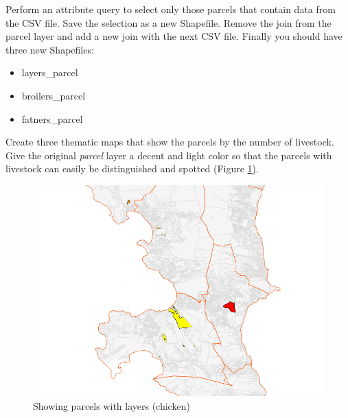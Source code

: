 \documentclass[a4paper,12pt,titlepage]{article}
\begin{document}
Perform an attribute query to select only those parcels that contain data from the CSV file. Save the selection as a new Shapefile. Remove the join from the parcel layer and add a new join with the next CSV file. Finally you should have three new Shapefiles:

\begin{itemize}
\item layers\_parcel
\item broilers\_parcel
\item fatners\_parcel
\end{itemize}

Create three thematic maps that show the parcels by the number of livestock. Give the original \textit{parcel} layer a decent and light color so that the parcels with livestock can easily be distinguished and spotted (Figure \ref{fig:layers_parcel}).

\begin{figure}[htb]
\centering
\includegraphics[width=12cm]{Images/layers_parcel.png}
\caption{Showing parcels with layers (chicken)}\label{fig:layers_parcel}
\end{figure}
\end{document}
